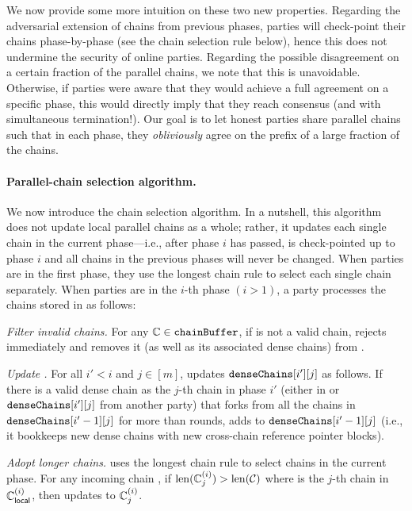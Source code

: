 We now provide some more intuition on these two new properties.
%
Regarding the adversarial extension of chains from previous phases, parties will check-point their chains phase-by-phase (see the chain selection rule below), hence this does not undermine the security of online parties.
%
Regarding the possible disagreement on a certain fraction of the parallel chains, we note that this is unavoidable.
%
Otherwise, if parties were aware that they would achieve a full agreement on a specific phase, this would directly imply that they reach consensus (and with simultaneous termination!).
%
Our goal is to let honest parties share parallel chains such that in each phase, they \emph{obliviously} agree on the prefix of a large fraction of the chains.

\paragraph{Parallel-chain selection algorithm.}
%
We now introduce the chain selection algorithm.
%
In a nutshell, this algorithm does not update local parallel chains as a whole; rather, it updates each single chain in the current phase---i.e., after phase $i$ has passed, \parallelChainsLocal is check-pointed up to phase $i$ and all chains in the previous phases will never be changed.
%
When parties are in the first phase, they use the longest chain rule to select each single chain separately.
%
When parties are in the $i$-th phase $(i > 1)$, a party \party processes the chains stored in \chainBuffer as follows:

\begin{cccItemize}[noitemsep]
      \item \emph{Filter invalid chains.}
      For any $\mathbb{C} \in \mathtt{chainBuffer}$, if \parallelChains is not a valid chain, \party rejects \parallelChains immediately and removes it (as well as its associated dense chains) from \chainBuffer.

      \item \emph{Update \denseChains.}
      For all $i' < i$ and $j \in [m]$, \party updates $\mathtt{denseChains}[i'][j]$ as follows.
      If there is a valid dense chain \chain as the $j$-th chain in phase $i'$ (either in \parallelChains or $\mathtt{denseChains}[i'][j]$ from another party) that forks from all the chains in $\mathtt{denseChains}[i' - 1][j]$ for more than \phaseRefLength rounds, \party adds \chain to $\mathtt{denseChains}[i' - 1][j]$ (i.e., it bookkeeps new dense chains with new cross-chain reference pointer blocks).

      \item \emph{Adopt longer chains.}
      \party uses the longest chain rule to select chains in the current phase.
      For any incoming chain \parallelChains, if $\mathrm{len}(\mathbb{C}^{(i)}_j) > \mathrm{len}(\mathcal{C})$ where \chain is the $j$-th chain in $\mathbb{C}_{\mathsf{local}}^{(i)}$, then \party updates \chain to $\mathbb{C}^{(i)}_j$.
\end{cccItemize}

